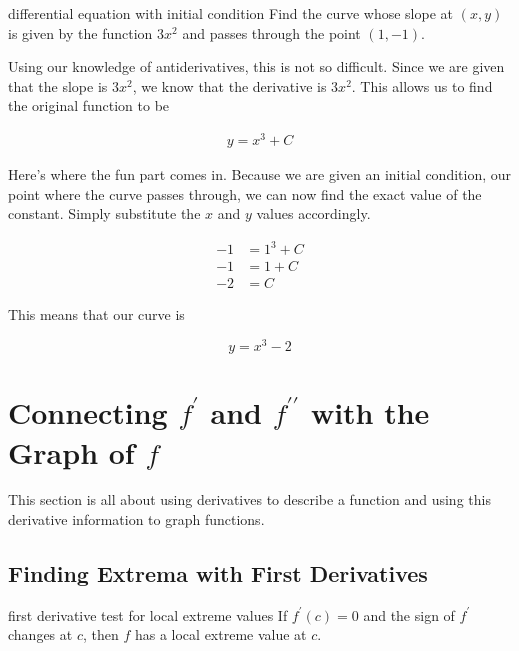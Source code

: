 \begin{example}{differential equation with initial condition}
    Find the curve whose slope at \( \left( x, y \right) \) is given by the function \( 3x^2 \) and passes through the point \( \left( 1, -1 \right) \).
    
    \vspace{0.3cm}
    
    Using our knowledge of antiderivatives, this is not so difficult. Since we are given that the slope is \( 3x^2 \), we know that the derivative is \( 3x^2 \). This allows us to find the original function to be
    
    \begin{align}
        y = x^3 + C
    \end{align}
    
    Here's where the fun part comes in. Because we are given an initial condition, our point where the curve passes through, we can now find the exact value of the constant. Simply substitute the \( x \) and \( y \) values accordingly.
    
    \begin{align}
        -1 &= 1^3 + C \\
        -1 &= 1 + C \\
        -2 &= C
    \end{align}
    
    This means that our curve is
    
    \[ y = x^3 - 2 \]
\end{example}

\section{Connecting \( f^\prime \) and \( f^{\prime\prime} \) with the Graph of \( f \)}

This section is all about using derivatives to describe a function and using this derivative information to graph functions.

\subsection{Finding Extrema with First Derivatives}

\begin{definition}{first derivative test for local extreme values}
    If \( f^\prime \left( c \right) = 0 \) and the sign of \( f^\prime \) changes at \( c \), then \( f \) has a local extreme value at \( c \).
\end{definition}

